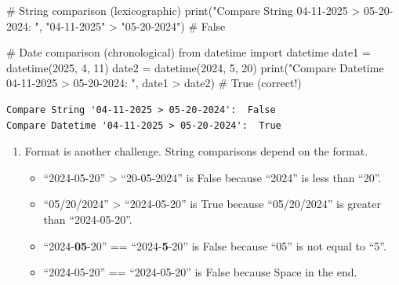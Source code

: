 \documentclass[
]{article}
\newenvironment{Shaded}{\begin{snugshade}}{\end{snugshade}}
\newcommand{\BuiltInTok}[1]{\textcolor[rgb]{0.00,0.23,0.31}{#1}}
\newcommand{\CommentTok}[1]{\textcolor[rgb]{0.37,0.37,0.37}{#1}}
\newcommand{\DecValTok}[1]{\textcolor[rgb]{0.68,0.00,0.00}{#1}}
\newcommand{\ImportTok}[1]{\textcolor[rgb]{0.00,0.46,0.62}{#1}}
\newcommand{\NormalTok}[1]{\textcolor[rgb]{0.00,0.23,0.31}{#1}}
\newcommand{\OperatorTok}[1]{\textcolor[rgb]{0.37,0.37,0.37}{#1}}
\newcommand{\StringTok}[1]{\textcolor[rgb]{0.13,0.47,0.30}{#1}}
\providecommand{\tightlist}{%
  \setlength{\itemsep}{0pt}\setlength{\parskip}{0pt}}
\begin{document}
\label{compare-date-string-and-datetime-2}
\begin{Shaded}
\begin{Highlighting}[]
\CommentTok{\# String comparison (lexicographic)}
\BuiltInTok{print}\NormalTok{(}\StringTok{"Compare String \textquotesingle{}04{-}11{-}2025 \textgreater{} 05{-}20{-}2024\textquotesingle{}: "}\NormalTok{, }\StringTok{"04{-}11{-}2025"} \OperatorTok{\textgreater{}} \StringTok{"05{-}20{-}2024"}\NormalTok{)  }\CommentTok{\# False }

\CommentTok{\# Date comparison (chronological)}
\ImportTok{from}\NormalTok{ datetime }\ImportTok{import}\NormalTok{ datetime}
\NormalTok{date1 }\OperatorTok{=}\NormalTok{ datetime(}\DecValTok{2025}\NormalTok{, }\DecValTok{4}\NormalTok{, }\DecValTok{11}\NormalTok{)}
\NormalTok{date2 }\OperatorTok{=}\NormalTok{ datetime(}\DecValTok{2024}\NormalTok{, }\DecValTok{5}\NormalTok{, }\DecValTok{20}\NormalTok{)}
\BuiltInTok{print}\NormalTok{(}\StringTok{"Compare Datetime \textquotesingle{}04{-}11{-}2025 \textgreater{} 05{-}20{-}2024\textquotesingle{}: "}\NormalTok{, date1 }\OperatorTok{\textgreater{}}\NormalTok{ date2)  }\CommentTok{\# True (correct!)}
\end{Highlighting}
\end{Shaded}

\begin{verbatim}
Compare String '04-11-2025 > 05-20-2024':  False
Compare Datetime '04-11-2025 > 05-20-2024':  True
\end{verbatim}

\begin{enumerate}
\def\labelenumi{\arabic{enumi}.}
\setcounter{enumi}{2}
\tightlist
\item
  Format is another challenge. String comparisons depend on the format.

  \begin{itemize}
  \tightlist
  \item
    ``2024-05-20'' \textgreater{} ``20-05-2024'' is False because
    ``2024'' is less than ``20''.
  \item
    ``05/20/2024'' \textgreater{} ``2024-05-20'' is True because
    ``05/20/2024'' is greater than ``2024-05-20''.
  \item
    ``2024-\textbf{05}-20'' == ``2024-\textbf{5}-20'' is False because
    ``05'' is not equal to ``5''.
  \item
    ``2024-05-20'' == ``2024-05-20'' is False because Space in the end.
  \end{itemize}
\end{enumerate}
\end{document}
